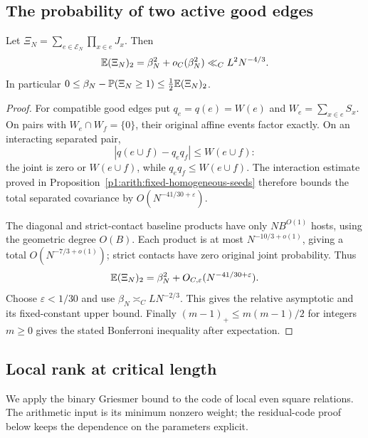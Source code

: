 \subsection{The probability of two active good edges}

\begin{lemma}
\label{p1:arith:twogoodpositive}
Let $\Xi_N=\sum_{e\in\mathcal E_N}\prod_{x\in e}J_x$.
Then
\[
 \mathbb E(\Xi_N)_2=\beta_N^2+o_C(\beta_N^2)
 \ll_C L^2N^{-4/3}.
\]
In particular
$0\leq\beta_N-\mathbb P(\Xi_N\geq1)\leq\tfrac12\mathbb E(\Xi_N)_2$.
\end{lemma}

\begin{proof}
For compatible good edges put $q_e=q(e)=W(e)$ and
$W_e=\sum_{x\in e}S_x$. On pairs with $W_e\cap W_f=\{0\}$,
their original affine events factor exactly.
On an interacting separated pair,
\[
 |q(e\cup f)-q_eq_f|\le W(e\cup f):
\]
the joint is zero or $W(e\cup f)$, while $q_eq_f\le W(e\cup f)$.
The interaction estimate proved in
Proposition~\ref{p1:arith:fixed-homogeneous-seeds} therefore bounds
the total separated covariance by $O(N^{-41/30+\varepsilon})$.

The diagonal and strict-contact baseline products have only
$NB^{O(1)}$ hosts, using the geometric degree $O(B)$.
Each product is at most $N^{-10/3+o(1)}$, giving a total
$O(N^{-7/3+o(1)})$;
strict contacts have zero original joint probability. Thus
\[
 \mathbb E(\Xi_N)_2=\beta_N^2+O_{C,\varepsilon}(N^{-41/30+\varepsilon}).
\]
Choose $\varepsilon<1/30$ and use $\beta_N\asymp_C LN^{-2/3}$.
This gives the relative asymptotic and its fixed-constant upper bound.
Finally $(m-1)_+\le m(m-1)/2$ for integers $m\ge0$ gives the
stated Bonferroni inequality after expectation.
\end{proof}


\subsection{Local rank at critical length}

We apply the binary Griesmer bound
\cite[Section~2, equation~(2.10)]{griesmer1960} to the code of
local even square relations. The arithmetic input is its minimum
nonzero weight; the residual-code proof below keeps the dependence
on the parameters explicit.

